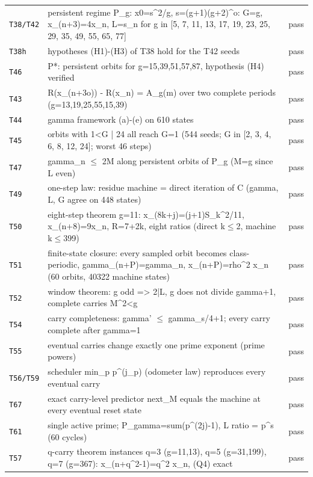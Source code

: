 \begin{longtable}{@{}p{13mm}p{100mm}p{11mm}@{}}
\texttt{T38/T42} & persistent regime P\_g: x0=s\^{}2/g, s=(g+1)(g+2)\^{}o: G=g, x\_(n+3)=4x\_n, L=s\_n for g in [5, 7, 11, 13, 17, 19, 23, 25, 29, 35, 49, 55, 65, 77] & pass \\
\texttt{T38h} & hypotheses (H1)-(H3) of T38 hold for the T42 seeds & pass \\
\texttt{T46} & P*: persistent orbits for g=15,39,51,57,87, hypothesis (H4) verified & pass \\
\texttt{T43} & R(x\_(n+3o)) - R(x\_n) = A\_g(m) over two complete periods (g=13,19,25,55,15,39) & pass \\
\texttt{T44} & gamma framework (a)-(e) on 610 states & pass \\
\texttt{T45} & orbits with 1<G | 24 all reach G=1 (544 seeds; G in [2, 3, 4, 6, 8, 12, 24]; worst 46 steps) & pass \\
\texttt{T47} & gamma\_n $\leq$ 2M along persistent orbits of P\_g (M=g since L even) & pass \\
\texttt{T49} & one-step law: residue machine = direct iteration of C (gamma, L, G agree on 448 states) & pass \\
\texttt{T50} & eight-step theorem g=11: x\_(8k+j)=(j+1)S\_k\^{}2/11, x\_(n+8)=9x\_n, R=7+2k, eight ratios (direct k$\leq$2, machine k$\leq$399) & pass \\
\texttt{T51} & finite-state closure: every sampled orbit becomes class-periodic, gamma\_(n+P)=gamma\_n, x\_(n+P)=rho\^{}2 x\_n (60 orbits, 40322 machine states) & pass \\
\texttt{T52} & window theorem: g odd => 2|L, g does not divide gamma+1, complete carries M\^{}2<g & pass \\
\texttt{T54} & carry completeness: gamma' $\leq$ gamma\_s/4+1; every carry complete after gamma=1 & pass \\
\texttt{T55} & eventual carries change exactly one prime exponent (prime powers) & pass \\
\texttt{T56/T59} & scheduler min\_p p\^{}(j\_p) (odometer law) reproduces every eventual carry & pass \\
\texttt{T67} & exact carry-level predictor next\_M equals the machine at every eventual reset state & pass \\
\texttt{T61} & single active prime; P\_gamma=sum(p\^{}(2j)-1), L ratio = p\^{}s (60 cycles) & pass \\
\texttt{T57} & q-carry theorem instances q=3 (g=11,13), q=5 (g=31,199), q=7 (g=367): x\_(n+q\^{}2-1)=q\^{}2 x\_n, (Q4) exact & pass \\

\end{longtable}
